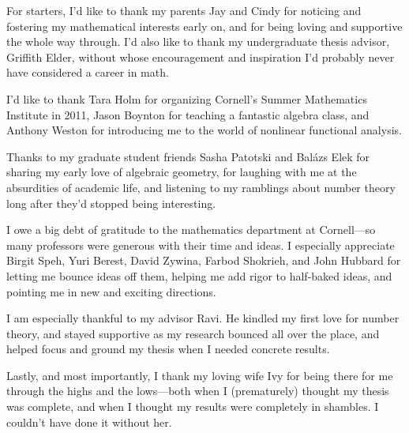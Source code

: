 \documentclass[phd,cornellheadings]{cornell}
\begin{document}
\begin{acknowledgements}
For starters, I'd like to thank my parents Jay and Cindy for noticing and 
fostering my mathematical interests early on, and for being loving and 
supportive the whole way through. I'd also like to thank my undergraduate 
thesis advisor, Griffith Elder, without whose encouragement and inspiration 
I'd probably never have considered a career in math. 

I'd like to thank Tara Holm for organizing Cornell's Summer Mathematics 
Institute in 2011, Jason Boynton for teaching a fantastic algebra class, and 
Anthony Weston for introducing me to the world of nonlinear functional 
analysis. 

Thanks to my graduate student friends Sasha Patotski and Bal\'azs Elek for 
sharing my early love of algebraic geometry, for laughing with me at the 
absurdities of academic life, and listening to my ramblings about number 
theory long after they'd stopped being interesting. 

I owe a big debt of gratitude to the mathematics department at Cornell---so 
many professors were generous with their time and ideas. I especially 
appreciate Birgit Speh, Yuri Berest, David Zywina, Farbod Shokrieh, and John 
Hubbard for letting me bounce ideas off them, helping me add rigor to 
half-baked ideas, and pointing me in new and exciting directions. 

I am especially thankful to my advisor Ravi. He kindled my first love for 
number theory, and stayed supportive as my research bounced all over the place, 
and helped focus and ground my thesis when I needed concrete results. 

Lastly, and most importantly, I thank my loving wife Ivy for being there for me 
through the highs and the lows---both when I (prematurely) thought my thesis was 
complete, and when I thought my results were completely in shambles. I couldn't 
have done it without her. 
\end{acknowledgements}

\contentspage

\normalspacing
\setcounter{page}{1}
\pagestyle{cornell}













%






\printbibliography[heading=bibintoc]
\end{document}
